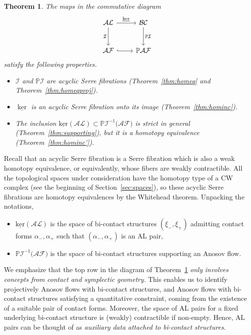 \documentclass[letterpaper, 11pt]{article}
\numberwithin{equation}{section}
\newtheorem{thmintro}{Theorem}
\begin{document}
\begin{thmintro} \label{thmintro:homeq}
The maps in the commutative diagram
$$ \begin{tikzcd}[row sep=large]
\mathcal{AL} \arrow[r, "\underline{\ker}"] \arrow[d, "\mathcal{I}"']		&		\mathcal{BC} \arrow[d, "\mathbb{P}\mathcal{I}"] \\
\mathcal{AF} \arrow[hookrightarrow,r]	&		\mathbb{P}\mathcal{AF}
\end{tikzcd}$$
satisfy the following properties.
\begin{itemize}
\item $\mathcal{I}$ and $\mathbb{P}\mathcal{I}$ are acyclic Serre fibrations (Theorem~\ref{thm:homeq} and Theorem~\ref{thm:homeqproj}).
\item $\underline{\ker}$ is an acyclic Serre fibration onto its image (Theorem~\ref{thm:hominc}).
\item The inclusion $\underline{\mathrm{ker}}(\mathcal{AL}) \subset \mathbb{P}\mathcal{I}^{-1}\big(\mathcal{AF}\big)$ is strict in general (Theorem~\ref{thm:supporting}), but it is a homotopy equivalence (Theorem~\ref{thm:hominc'}).
\end{itemize}
\end{thmintro}

Recall that an acyclic Serre fibration is a Serre fibration which is also a weak homotopy equivalence, or equivalently, whose fibers are weakly contractible. All the topological spaces under consideration have the homotopy type of a CW complex (see the beginning of Section~\ref{sec:spaces}), so these acyclic Serre fibrations are homotopy equivalences by the Whitehead theorem. Unpacking the notations, \begin{itemize}
\item $\underline{\mathrm{ker}}(\mathcal{AL})$ is the space of bi-contact structures $(\xi_-, \xi_+)$ admitting contact forms $\alpha_-, \alpha_+$ such that $(\alpha_-, \alpha_+)$ is an AL pair,
\item $\mathbb{P}\mathcal{I}^{-1}\big(\mathcal{AF}\big)$ is the space of bi-contact structures supporting an Anosov flow.
\end{itemize}

We emphasize that the top row in the diagram of Theorem~\ref{thmintro:homeq} \emph{only involves concepts from contact and symplectic geometry.} This enables us to identify projectively Anosov flows with bi-contact structures, and Anosov flows with bi-contact structures satisfying a quantitative constraint, coming from the existence of a suitable pair of contact forms. Moreover, the space of AL pairs for a fixed underlying bi-contact structure is (weakly) contractible if non-empty. Hence, AL pairs can be thought of as \emph{auxiliary data attached to bi-contact structures}.
\end{document}
